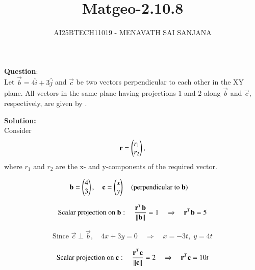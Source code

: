 \documentclass[journal]{IEEEtran}
\begin{document}

\vspace{3cm}

\title{Matgeo-2.10.8}
\author{AI25BTECH11019 - MENAVATH SAI SANJANA}
{\let\newpage\relax\maketitle}

\renewcommand{\thefigure}{\theenumi}
\renewcommand{\thetable}{\theenumi}
\setlength{\intextsep}{10pt} %

\renewcommand{\thetable}{\theenumi}

\textbf{Question}:\\
Let $\vec{b} = 4\hat{i} + 3\hat{j}$ and $\vec{c}$ be two vectors perpendicular to each other in the XY plane.  
All vectors in the same plane having projections $1$ and $2$ along $\vec{b}$ and $\vec{c}$, respectively, are given by .
\\
\bigskip

\textbf{Solution: } \\

Consider 
\begin{align}
\mathbf{r} = \begin{pmatrix}r_1\\r_2\end{pmatrix},
\end{align}
where $r_1$ and $r_2$ are the x- and y-components of the required vector.

\begin{align}
\mathbf{b} &= \begin{pmatrix}4\\3\end{pmatrix}, \quad
\mathbf{c} = \begin{pmatrix}x\\y\end{pmatrix} \quad \text{(perpendicular to } \mathbf{b}\text{)}
\end{align}

\begin{align}
\text{Scalar projection on } \mathbf{b}: \quad 
\frac{\mathbf{r}^T \mathbf{b}}{\left\lVert\mathbf{b}\right\rVert} = 1 
\quad \Rightarrow \quad \mathbf{r}^T \mathbf{b} = 5
\end{align}

\begin{align}
\text{Since } \vec{c} \perp \vec{b}, \quad 4x + 3y = 0 
\quad \Rightarrow \quad x = -3t,\; y = 4t
\end{align}

\begin{align}
\text{Scalar projection on } \mathbf{c}: \quad
\frac{\mathbf{r}^T \mathbf{c}}{\left\lVert\mathbf{c}\right\rVert} = 2 
\quad \Rightarrow \quad \mathbf{r}^T \mathbf{c} = 10t
\end{align}
\end{document}
